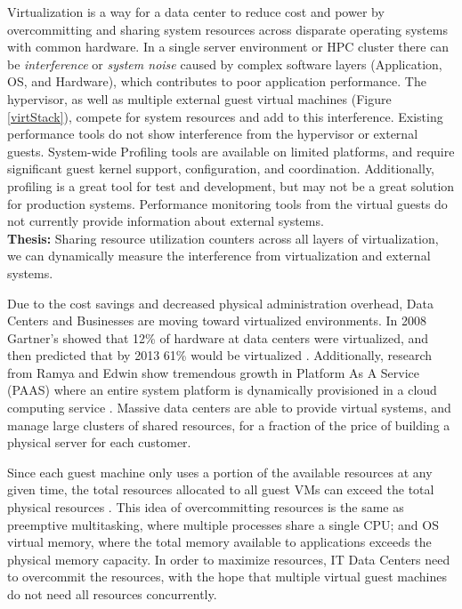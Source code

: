 Virtualization is a way for a data center to reduce cost and power by overcommitting and sharing system resources across disparate operating systems with common hardware.  
In a single server environment or HPC cluster there can be \emph{interference} \cite{paul} or \emph{system noise}\cite{tsafrir} caused by complex software layers (Application, OS, and Hardware), which contributes to poor application performance.  
The hypervisor, as well as multiple external guest virtual machines (Figure \ref{virtStack}), compete for system resources and add to this interference.  
Existing performance tools do not show interference from the hypervisor or external guests.  
System-wide Profiling tools are available on limited platforms, and require significant guest kernel support, configuration, and coordination.  
Additionally, profiling is a great tool for test and development, but may not be a great solution for production systems.
Performance monitoring tools from the virtual guests do not currently provide information about external systems.\\
\textbf{Thesis:  }Sharing resource utilization counters across all layers of virtualization, we can dynamically measure the interference from virtualization and external systems.


\indent Due to the cost savings and decreased physical administration overhead, Data Centers and Businesses are moving toward virtualized environments.  In 2008 Gartner’s showed that 12\% of hardware at data centers were virtualized, and then predicted that by 2013 61\% would be virtualized \cite{gartners}.   Additionally, research from Ramya and Edwin show tremendous growth in Platform As A Service (PAAS) where an entire system platform is dynamically provisioned in a cloud computing service \cite{ramya}.   Massive data centers are able to provide virtual systems, and manage large clusters of shared resources, for a fraction of the price of building a physical server for each customer.

\indent Since each guest machine only uses a portion of the available resources at any given time, the total resources allocated to all guest VMs can exceed the total physical resources \cite{huber2, amit, buell1}.   This idea of overcommitting resources is the same as preemptive multitasking, where multiple processes share a single CPU; and OS virtual memory, where the total memory available to applications exceeds the physical memory capacity.  In order to maximize resources, IT Data Centers need to overcommit the resources, with the hope that multiple virtual guest machines do not need all resources concurrently.  

